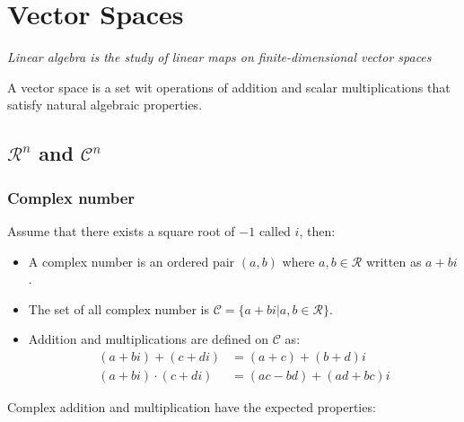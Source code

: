 \chapter{Vector Spaces}
\begin{center}
  \emph{Linear algebra is the study of linear maps on finite-dimensional vector spaces}
\end{center}
A vector space is a set wit operations of addition and scalar multiplications that satisfy natural algebraic properties.

\section{$\mathcal{R}^n$ and $\mathcal{C}^n$}
  \subsection{Complex number}
  Assume that there exists a square root of $-1$ called $i$, then:

  \begin{multicols}{2}
    \begin{itemize}
      \item A complex number is an ordered pair $(a,b)$ where $a,b\in\mathcal{R}$ written as $a+bi$.
      \item The set of all complex number is $\mathcal{C} = \{a+bi | a,b\in\mathcal{R}\}$.
      \item Addition and multiplications are defined on $\mathcal{C}$ as:
        \begin{align*}
          (a+bi) + (c+di) &= (a+c) + (b+d)i\\
          (a+bi) \cdot (c+di) &= (ac - bd) + (ad+bc)i
        \end{align*}
    \end{itemize}
  \end{multicols}

  Complex addition and multiplication have the expected properties:

